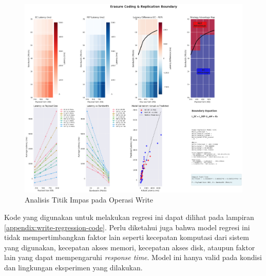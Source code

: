 \begin{enumerate}
  \begin{figure}[ht]
    \centering
    \includegraphics[width=\textwidth]{resources/chapter-4/write_bigload_avgnet_boundary.png}

    \caption{Analisis Titik Impas pada Operasi Write}
    \label{fig:write-bigload-avgnet-boundary}
  \end{figure}

  Kode yang digunakan untuk melakukan regresi ini dapat dilihat pada lampiran \ref{appendix:write-regression-code}. Perlu diketahui juga bahwa model regresi ini tidak mempertimbangkan faktor lain seperti kecepatan komputasi dari sistem yang digunakan, kecepatan akses memori, kecepatan akses disk, ataupun faktor lain yang dapat mempengaruhi \textit{response time}. Model ini hanya valid pada kondisi dan lingkungan eksperimen yang dilakukan.

\end{enumerate}